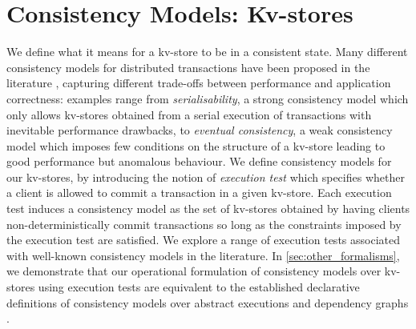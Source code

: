 \section{Consistency Models: Kv-stores}
\label{sec:cm}
We define what it means for a kv-store 
to be in a consistent state. Many different consistency models for
distributed transactions have 
been proposed in the literature
\cite{principle-eventual-consistency,rola,redblue,PSI,si},
capturing different trade-offs 
between  performance and application
correctness: examples range from  \emph{serialisability}, a strong
consistency model which only allows kv-stores 
obtained  from a serial execution of transactions
with inevitable performance drawbacks, to  \emph{eventual consistency},  a weak consistency model
which imposes few conditions on the structure of a kv-store leading to
good performance but anomalous behaviour.
We define consistency models for our kv-stores,
by introducing the notion of 
\emph{execution test} which specifies  whether a client is allowed to commit a transaction in a given 
kv-store. Each execution test induces a consistency model as the set of kv-stores obtained 
by having clients non-deterministically commit transactions so long as  the constraints 
imposed by the execution test are satisfied.
We explore a range of execution tests  associated with well-known consistency models in the literature. 
In \cref{sec:other_formalisms},  we demonstrate that our operational
formulation of  consistency models over kv-stores using execution
tests are  equivalent to the established declarative definitions of
consistency models  over abstract executions \cite{ev_transactions,framework-concur} and dependency graphs \cite{adya}.


%
%
%





%
%

